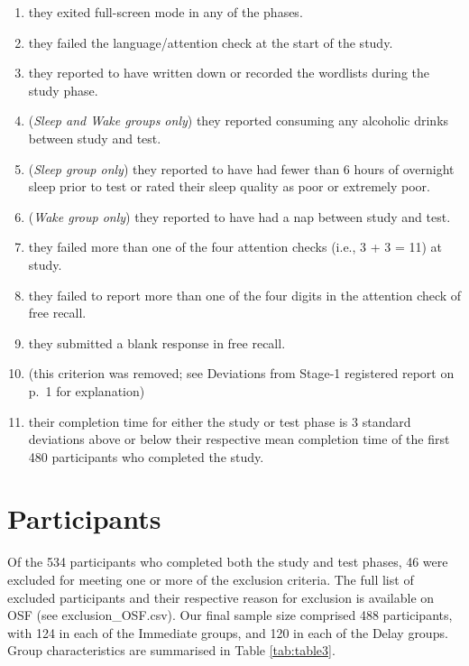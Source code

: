 \documentclass[
]{article}
\begin{document}
\begin{enumerate}
\def\labelenumi{\arabic{enumi}.}
\item
  they exited full-screen mode in any of the phases.
\item
  they failed the language/attention check at the start of the study.
\item
  they reported to have written down or recorded the wordlists during the study phase.
\item
  (\emph{Sleep and Wake groups only}) they reported consuming any alcoholic drinks between study and test.
\item
  (\emph{Sleep group only}) they reported to have had fewer than 6 hours of overnight sleep prior to test or rated their sleep quality as poor or extremely poor.
\item
  (\emph{Wake group only}) they reported to have had a nap between study and test.
\item
  they failed more than one of the four attention checks (i.e., 3 + 3 = 11) at study.
\item
  they failed to report more than one of the four digits in the attention check of free recall.
\item
  they submitted a blank response in free recall.
\item
  (this criterion was removed; see Deviations from Stage-1 registered report on p.~1 for explanation)
\item
  their completion time for either the study or test phase is 3 standard deviations above or below their respective mean completion time of the first 480 participants who completed the study.
\end{enumerate}

\hypertarget{participants}{%
\section{Participants}\label{participants}}

Of the 534 participants who completed both the study and test phases, 46 were excluded for meeting one or more of the exclusion criteria. The full list of excluded participants and their respective reason for exclusion is available on OSF (see exclusion\_OSF.csv). Our final sample size comprised 488 participants, with 124 in each of the Immediate groups, and 120 in each of the Delay groups. Group characteristics are summarised in Table \ref{tab:table3}.
\end{document}
